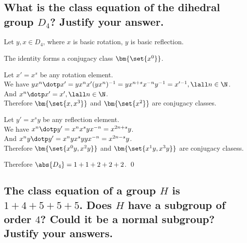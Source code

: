 \section[Problem 2]{}
    \subsection[(i)]{What is the class equation of the dihedral group $D_4$? Justify your answer.}
        Let $y, x \in D_4$, where $x$ is basic rotation, $y$ is basic reflection.
        
        The identity forms a conjugacy class $\bm{\set{x^0}}$.

        Let $x' = x^s$ be any rotation element. \\
        We have $yx^n \dotp x' = yx^n x' (yx^n)^{-1} = yx^{n+s} x^{-n}y^{-1} = x'^{-1}, \lall n \in \N$.\\
        And $x^n \dotp x' = x', \lall n \in \N$.\\
        Therefore $\bm{\set{x, x^3}}$ and $\bm{\set{x^2}}$ are conjugacy classes.

        Let $y' = x^s y$ be any reflection element.\\
        We have $x^n \dotp y' = x^n x^s y x^{-n} = x^{2n + s} y$.\\
        And $x^n y \dotp y' = x^n y x^s y y x^{-n} = x^{2n - s} y$. \\ 
        Therefore $\bm{\set{x^0 y, x^2 y}}$ and $\bm{\set{x^1 y, x^3 y}}$ are conjugacy clasess.

        Therefore $\abs{D_4} = 1 + 1 + 2 + 2 + 2$.
        \qed

    \subsection[(ii)]{The class equation of a group $H$ is $1+4+5+5+5$. Does $H$ have a subgroup of
        order $4$? Could it be a normal subgroup? Justify your answers.}
        



